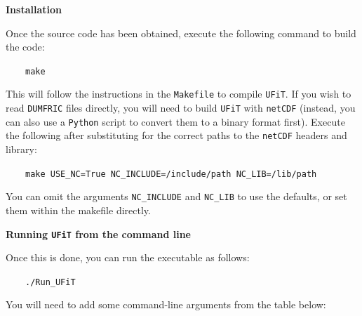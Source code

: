 \documentclass[12pt,twoside]{article}
\begin{document}
\vspace{4mm}
{\Large \textbf{Installation}}

Once the source code has been obtained, execute the following command to build the code:

$\quad\quad$\texttt{make}

This will follow the instructions in the \texttt{Makefile} to compile \texttt{UFiT}. If you wish to read \texttt{DUMFRIC} files directly, you will need to build \texttt{UFiT} with \texttt{netCDF} (instead, you can also use a \texttt{Python} script to convert them to a binary format first). Execute the following after substituting for the correct paths to the \texttt{netCDF} headers and library:

$\quad\quad$\texttt{make USE\_NC=True NC\_INCLUDE=/include/path NC\_LIB=/lib/path}

You can omit the arguments \texttt{NC\_INCLUDE} and \texttt{NC\_LIB} to use the defaults, or set them within the makefile directly.


\vspace{2mm}
{\Large \textbf{Running \texttt{UFiT} from the command line}}

Once this is done, you can run the executable as follows: 

$\quad\quad$\texttt{./Run\_UFiT}

\newpage

You will need to add some command-line arguments from the table below:

\vspace{2mm}
\end{document}
